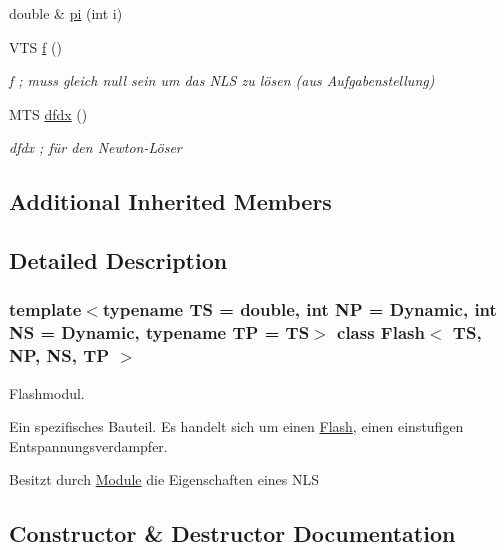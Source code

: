 \begin{DoxyCompactItemize}
\item 
double \& \mbox{\hyperlink{class_flash_ae54dbc3d5d7b87c854a765e9b5f4e519}{pi}} (int i)
\item 
V\+TS \mbox{\hyperlink{class_flash_ad29e755877ca96aa5b9f34a10d6cd8b2}{f}} ()
\begin{DoxyCompactList}\small\item\em f ; muss gleich null sein um das N\+LS zu lösen (aus Aufgabenstellung) \end{DoxyCompactList}\item 
M\+TS \mbox{\hyperlink{class_flash_a83e35b3ab13b3705f0fe06c40b800a8b}{dfdx}} ()
\begin{DoxyCompactList}\small\item\em dfdx ; für den Newton-\/\+Löser \end{DoxyCompactList}\end{DoxyCompactItemize}
\subsection*{Additional Inherited Members}


\subsection{Detailed Description}
\subsubsection*{template$<$typename TS = double, int NP = Dynamic, int NS = Dynamic, typename TP = TS$>$\newline
class Flash$<$ T\+S, N\+P, N\+S, T\+P $>$}

Flashmodul. 

Ein spezifisches Bauteil. Es handelt sich um einen \mbox{\hyperlink{class_flash}{Flash}}, einen einstufigen Entspannungsverdampfer.

Besitzt durch \mbox{\hyperlink{class_module}{Module}} die Eigenschaften eines N\+LS 

\subsection{Constructor \& Destructor Documentation}
\mbox{\label{class_flash_afe08d3b05a9b5abe02071065b46abf62}} 
